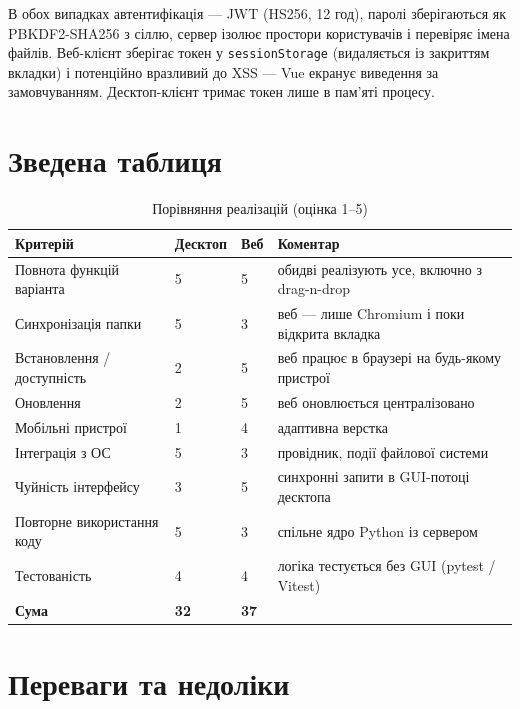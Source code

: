 \documentclass[12pt,a4paper]{article}
\begin{document}
В обох випадках автентифікація --- JWT (HS256, 12 год), паролі зберігаються як PBKDF2-SHA256 з сіллю, сервер ізолює простори користувачів і перевіряє імена файлів. Веб-клієнт зберігає токен у \texttt{sessionStorage} (видаляється із закриттям вкладки) і потенційно вразливий до XSS --- Vue екранує виведення за замовчуванням. Десктоп-клієнт тримає токен лише в пам'яті процесу.


\section{Зведена таблиця}

{\small
\begin{longtable}{@{}p{5cm}p{2cm}p{2cm}p{7cm}@{}}
\caption{Порівняння реалізацій (оцінка 1--5)}\\
\toprule
\textbf{Критерій} & \textbf{Десктоп} & \textbf{Веб} & \textbf{Коментар} \\
\midrule
\endhead
Повнота функцій варіанта & 5 & 5 & обидві реалізують усе, включно з drag-n-drop \\ \midrule
Синхронізація папки & 5 & 3 & веб --- лише Chromium і поки відкрита вкладка \\ \midrule
Встановлення / доступність & 2 & 5 & веб працює в браузері на будь-якому пристрої \\ \midrule
Оновлення & 2 & 5 & веб оновлюється централізовано \\ \midrule
Мобільні пристрої & 1 & 4 & адаптивна верстка \\ \midrule
Інтеграція з ОС & 5 & 3 & провідник, події файлової системи \\ \midrule
Чуйність інтерфейсу & 3 & 5 & синхронні запити в GUI-потоці десктопа \\ \midrule
Повторне використання коду & 5 & 3 & спільне ядро Python із сервером \\ \midrule
Тестованість & 4 & 4 & логіка тестується без GUI (pytest / Vitest) \\ \midrule
\textbf{Сума} & \textbf{32} & \textbf{37} &  \\ \midrule
\bottomrule
\end{longtable}}


\section{Переваги та недоліки}
\end{document}
